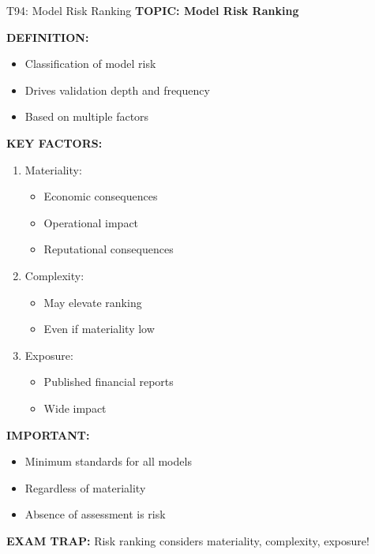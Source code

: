 \documentclass[8pt]{beamer}
\begin{document}
	\begin{frame}{T94: Model Risk Ranking}
		\fontsize{6.5}{7.5}\selectfont
		\textbf{TOPIC: Model Risk Ranking}
		
		\vspace{0.1cm}
		\textbf{DEFINITION:}
		\begin{itemize}
			\item Classification of model risk
			\item Drives validation depth and frequency
			\item Based on multiple factors
		\end{itemize}
		
		\vspace{0.1cm}
		\textbf{KEY FACTORS:}
		\begin{enumerate}
			\item \textcolor{myblue}{Materiality:}
			\begin{itemize}
				\item Economic consequences
				\item Operational impact
				\item Reputational consequences
			\end{itemize}
			\item \textcolor{myblue}{Complexity:}
			\begin{itemize}
				\item May elevate ranking
				\item Even if materiality low
			\end{itemize}
			\item \textcolor{myblue}{Exposure:}
			\begin{itemize}
				\item Published financial reports
				\item Wide impact
			\end{itemize}
		\end{enumerate}
		
		\vspace{0.1cm}
		\textbf{IMPORTANT:}
		\begin{itemize}
			\item Minimum standards for all models
			\item Regardless of materiality
			\item Absence of assessment is risk
		\end{itemize}
		
		\textcolor{myred}{\textbf{EXAM TRAP:}} Risk ranking considers \textcolor{myblue}{materiality, complexity, exposure}!
	\end{frame}
	
\end{document}
